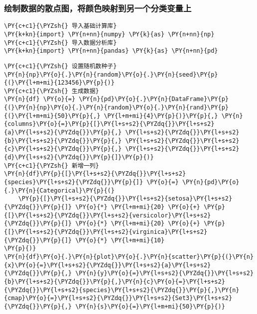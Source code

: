     \hypertarget{ux7ed8ux5236ux6570ux636eux7684ux6563ux70b9ux56feux5c06ux989cux8272ux6620ux5c04ux5230ux53e6ux4e00ux4e2aux5206ux7c7bux53d8ux91cfux4e0a}{%
\subsubsection{绘制数据的散点图，将颜色映射到另一个分类变量上}\label{ux7ed8ux5236ux6570ux636eux7684ux6563ux70b9ux56feux5c06ux989cux8272ux6620ux5c04ux5230ux53e6ux4e00ux4e2aux5206ux7c7bux53d8ux91cfux4e0a}}

    \begin{tcolorbox}[breakable, size=fbox, boxrule=1pt, pad at break*=1mm,colback=cellbackground, colframe=cellborder]
\begin{Verbatim}[commandchars=\\\{\}]
\PY{c+c1}{\PYZsh{} 导入基础计算库}
\PY{k+kn}{import} \PY{n+nn}{numpy} \PY{k}{as} \PY{n+nn}{np}
\PY{c+c1}{\PYZsh{} 导入数据分析库}
\PY{k+kn}{import} \PY{n+nn}{pandas} \PY{k}{as} \PY{n+nn}{pd}
\end{Verbatim}
\end{tcolorbox}

    \begin{tcolorbox}[breakable, size=fbox, boxrule=1pt, pad at break*=1mm,colback=cellbackground, colframe=cellborder]
\begin{Verbatim}[commandchars=\\\{\}]
\PY{c+c1}{\PYZsh{} 设置随机数种子}
\PY{n}{np}\PY{o}{.}\PY{n}{random}\PY{o}{.}\PY{n}{seed}\PY{p}{(}\PY{l+m+mi}{123456}\PY{p}{)}
\PY{c+c1}{\PYZsh{} 生成数据}
\PY{n}{df} \PY{o}{=} \PY{n}{pd}\PY{o}{.}\PY{n}{DataFrame}\PY{p}{(}\PY{n}{np}\PY{o}{.}\PY{n}{random}\PY{o}{.}\PY{n}{rand}\PY{p}{(}\PY{l+m+mi}{50}\PY{p}{,} \PY{l+m+mi}{4}\PY{p}{)}\PY{p}{,} \PY{n}{columns}\PY{o}{=}\PY{p}{[}\PY{l+s+s2}{\PYZdq{}}\PY{l+s+s2}{a}\PY{l+s+s2}{\PYZdq{}}\PY{p}{,} \PY{l+s+s2}{\PYZdq{}}\PY{l+s+s2}{b}\PY{l+s+s2}{\PYZdq{}}\PY{p}{,} \PY{l+s+s2}{\PYZdq{}}\PY{l+s+s2}{c}\PY{l+s+s2}{\PYZdq{}}\PY{p}{,} \PY{l+s+s2}{\PYZdq{}}\PY{l+s+s2}{d}\PY{l+s+s2}{\PYZdq{}}\PY{p}{]}\PY{p}{)}
\PY{c+c1}{\PYZsh{} 新增一列}
\PY{n}{df}\PY{p}{[}\PY{l+s+s2}{\PYZdq{}}\PY{l+s+s2}{species}\PY{l+s+s2}{\PYZdq{}}\PY{p}{]} \PY{o}{=} \PY{n}{pd}\PY{o}{.}\PY{n}{Categorical}\PY{p}{(}
    \PY{p}{[}\PY{l+s+s2}{\PYZdq{}}\PY{l+s+s2}{setosa}\PY{l+s+s2}{\PYZdq{}}\PY{p}{]} \PY{o}{*} \PY{l+m+mi}{20} \PY{o}{+} \PY{p}{[}\PY{l+s+s2}{\PYZdq{}}\PY{l+s+s2}{versicolor}\PY{l+s+s2}{\PYZdq{}}\PY{p}{]} \PY{o}{*} \PY{l+m+mi}{20} \PY{o}{+} \PY{p}{[}\PY{l+s+s2}{\PYZdq{}}\PY{l+s+s2}{virginica}\PY{l+s+s2}{\PYZdq{}}\PY{p}{]} \PY{o}{*} \PY{l+m+mi}{10}
\PY{p}{)}
\PY{n}{df}\PY{o}{.}\PY{n}{plot}\PY{o}{.}\PY{n}{scatter}\PY{p}{(}\PY{n}{x}\PY{o}{=}\PY{l+s+s2}{\PYZdq{}}\PY{l+s+s2}{a}\PY{l+s+s2}{\PYZdq{}}\PY{p}{,} \PY{n}{y}\PY{o}{=}\PY{l+s+s2}{\PYZdq{}}\PY{l+s+s2}{b}\PY{l+s+s2}{\PYZdq{}}\PY{p}{,}\PY{n}{c}\PY{o}{=}\PY{l+s+s2}{\PYZdq{}}\PY{l+s+s2}{species}\PY{l+s+s2}{\PYZdq{}}\PY{p}{,}\PY{n}{cmap}\PY{o}{=}\PY{l+s+s2}{\PYZdq{}}\PY{l+s+s2}{Set3}\PY{l+s+s2}{\PYZdq{}}\PY{p}{,} \PY{n}{s}\PY{o}{=}\PY{l+m+mi}{50}\PY{p}{)}
\end{Verbatim}
\end{tcolorbox}

